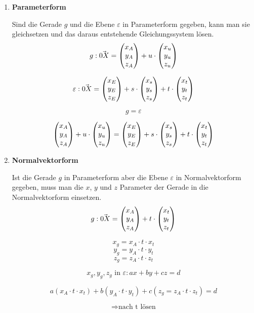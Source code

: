 \begin{enumerate}
  \item{\textbf{Parameterform}}

  Sind die Gerade $g$ und die Ebene $\varepsilon$ in Parameterform gegeben, kann man sie gleichsetzen und das daraus entstehende Gleichungssystem l\"{o}sen.
  $$g: \vec{0X} = \begin{pmatrix}x_A \\ y_A \\ z_A\end{pmatrix} + u \cdot \begin{pmatrix}x_u \\ y_u \\ z_u\end{pmatrix}$$ 

  $$\varepsilon: \vec{0X} = \begin{pmatrix}x_E \\ y_E \\ z_E\end{pmatrix} + s \cdot \begin{pmatrix}x_s \\ y_s \\ z_s\end{pmatrix} + t \cdot \begin{pmatrix}x_t \\ y_t \\ z_t\end{pmatrix}$$ 

  $$g = \varepsilon$$ 

  $$\begin{pmatrix}x_A \\ y_A \\ z_A\end{pmatrix} + u \cdot \begin{pmatrix}x_u \\ y_u \\ z_u\end{pmatrix} = \begin{pmatrix}x_E \\ y_E \\ z_E\end{pmatrix} + s \cdot \begin{pmatrix}x_s \\ y_s \\ z_s\end{pmatrix} + t \cdot \begin{pmatrix}x_t \\ y_t \\ z_t\end{pmatrix}$$

  \item{\textbf{Normalvektorform}}

  Ist die Gerade $g$ in Parameterform aber die Ebene $\varepsilon$ in Normalvektorform gegeben, muss man die $x$, $y$ und $z$ Parameter der Gerade in die Normalvektorform einsetzen. $$g: \vec{0X} = \begin{pmatrix}x_A \\ y_A \\ z_A\end{pmatrix} + t \cdot \begin{pmatrix}x_t \\ y_t \\ z_t\end{pmatrix}$$

  $$x_g = x_A \cdot t \cdot x_t$$ $$y_g = y_A \cdot t \cdot y_t$$ $$z_g = z_A \cdot t \cdot z_t$$

  $$x_g, y_g, z_g \text{ in } \varepsilon: ax + by + cz = d$$

  $$ a(x_A \cdot t \cdot x_t) + b(y_A \cdot t \cdot y_t) + c(z_g = z_A \cdot t \cdot z_t) = d$$

  $$\Rightarrow \text{nach t l\"{o}sen}$$


\end{enumerate}


